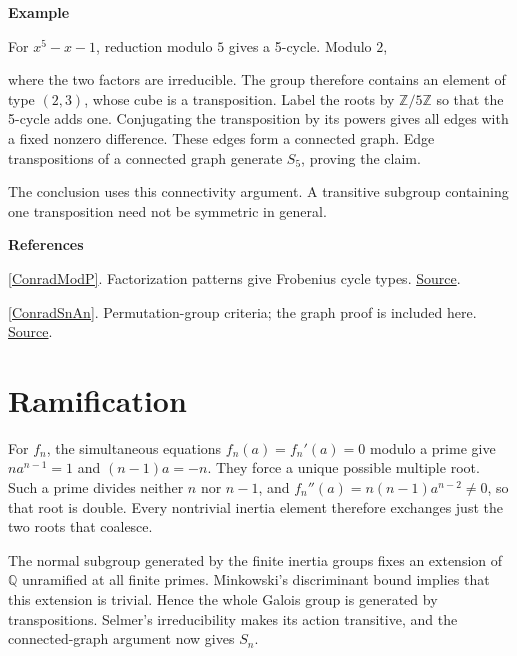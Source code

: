 \documentclass[11pt,a4paper,oneside,openany]{book}
\newcommand{\atlasdisplay}[1]{\par\begingroup\centering\vspace{3pt}\noindent\adjustbox{max width=\linewidth}{\(\displaystyle #1\)}\par\vspace{5pt}\endgroup}
\newenvironment{sources}{\par\smallskip\begingroup\footnotesize\color{atlasgray}\leftskip=10pt\setlength{\parskip}{2pt}}{\par\endgroup\smallskip}
\begin{document}
\begin{atlasblock}[standard]
\textbf{\sffamily Example}\par\smallskip
\color{black} For \(x^5-x-1\), reduction modulo \(5\) gives a 5-cycle. Modulo \(2\),\par

\atlasdisplay{x^5+x+1=(x^2+x+1)(x^3+x^2+1),}
\color{black} where the two factors are irreducible. The group therefore contains an element of type \((2,3)\), whose cube is a transposition. Label the roots by \(\mathbb Z/5\mathbb Z\) so that the 5-cycle adds one. Conjugating the transposition by its powers gives all edges with a fixed nonzero difference. These edges form a connected graph. Edge transpositions of a connected graph generate \(S_5\), proving the claim.\par
\end{atlasblock}\color{black}
\color{black} The conclusion uses this connectivity argument. A transitive subgroup containing one transposition need not be symmetric in general.\par
\begin{sources}
\textbf{References}\par\smallskip
\noindent\hyperlink{ref:ConradModP}{[ConradModP]}. Factorization patterns give Frobenius cycle types. \href{https://kconrad.math.uconn.edu/blurbs/gradnumthy/galois-Q-factor-mod-p.pdf}{Source}.\par
\noindent\hyperlink{ref:ConradSnAn}{[ConradSnAn]}. Permutation-group criteria; the graph proof is included here. \href{https://kconrad.math.uconn.edu/blurbs/galoistheory/galoisSnAn.pdf}{Source}.\par
\end{sources}\color{black}
\section{Ramification}
\color{black} For \(f_n\), the simultaneous equations \(f_n(a)=f_n'(a)=0\) modulo a prime give \(na^{n-1}=1\) and \((n-1)a=-n\). They force a unique possible multiple root. Such a prime divides neither \(n\) nor \(n-1\), and \(f_n''(a)=n(n-1)a^{n-2}\ne0\), so that root is double. Every nontrivial inertia element therefore exchanges just the two roots that coalesce.\par
\color{black} The normal subgroup generated by the finite inertia groups fixes an extension of \(\mathbb Q\) unramified at all finite primes. Minkowski's discriminant bound implies that this extension is trivial. Hence the whole Galois group is generated by transpositions. Selmer's irreducibility makes its action transitive, and the connected-graph argument now gives \(S_n\).\par
\end{document}
